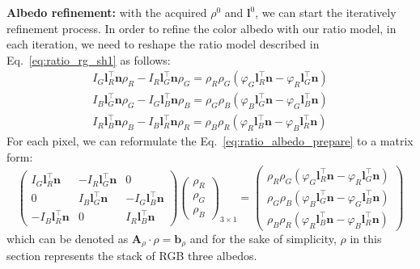 \textbf{Albedo refinement:}
with the acquired $\rho^{0}$ and $\mathbf{l}^{0}$, we can start the iteratively refinement process.
In order to refine the color albedo with our ratio model, in each iteration, we need to reshape the ratio model described in Eq.~\ref{eq:ratio_rg_sh1} as follows:
\begin{equation}\label{eq:ratio_albedo_prepare}
\begin{split}
I_G \mathbf{l}_R^\top\mathbf{n} \rho_R - I_R \mathbf{l}_G^\top\mathbf{n} \rho_G  = \rho_R \rho_G (\varphi_G\mathbf{l}_R^\top \mathbf{n} - \varphi_R\mathbf{l}_G^\top \mathbf{n})\\
I_B \mathbf{l}_G^\top\mathbf{n} \rho_G - I_G \mathbf{l}_B^\top\mathbf{n} \rho_B  = \rho_G \rho_B (\varphi_B\mathbf{l}_G^\top \mathbf{n} - \varphi_G\mathbf{l}_B^\top \mathbf{n})\\
I_R \mathbf{l}_B^\top\mathbf{n} \rho_B - I_B \mathbf{l}_R^\top\mathbf{n} \rho_R  = \rho_B \rho_R (\varphi_R\mathbf{l}_B^\top \mathbf{n} - \varphi_B\mathbf{l}_R^\top \mathbf{n})
\end{split}
\end{equation}
For each pixel, we can reformulate the Eq.~\ref{eq:ratio_albedo_prepare} to a matrix form:
\begin{equation}\label{eq:rho_matrix}
    \begin{pmatrix}
        I_G \mathbf{l}_R^\top\mathbf{n} & - I_R \mathbf{l}_G^\top\mathbf{n} & 0 \\
        0 & I_B \mathbf{l}_G^\top\mathbf{n} & - I_G \mathbf{l}_B^\top\mathbf{n} \\
        - I_B \mathbf{l}_R^\top\mathbf{n} & 0 & I_R \mathbf{l}_B^\top\mathbf{n} 
    \end{pmatrix}
    \begin{pmatrix}
        \rho_R\\
        \rho_G\\
        \rho_B
     \end{pmatrix}_{3 \times 1}
    =
    \begin{pmatrix}
        \rho_R \rho_G (\varphi_G\mathbf{l}_R^\top \mathbf{n} - \varphi_R\mathbf{l}_G^\top \mathbf{n})\\
        \rho_G \rho_B (\varphi_B\mathbf{l}_G^\top \mathbf{n} - \varphi_G\mathbf{l}_B^\top \mathbf{n})\\
        \rho_B \rho_R (\varphi_R\mathbf{l}_B^\top \mathbf{n} - \varphi_B\mathbf{l}_R^\top \mathbf{n})
    \end{pmatrix}
\end{equation}
which can be denoted as $\mathbf{A}_{\rho}\cdot \rho = \mathbf{b}_{\rho}$ and for the sake of simplicity, $\rho$ in this section represents the stack of RGB three albedos.

